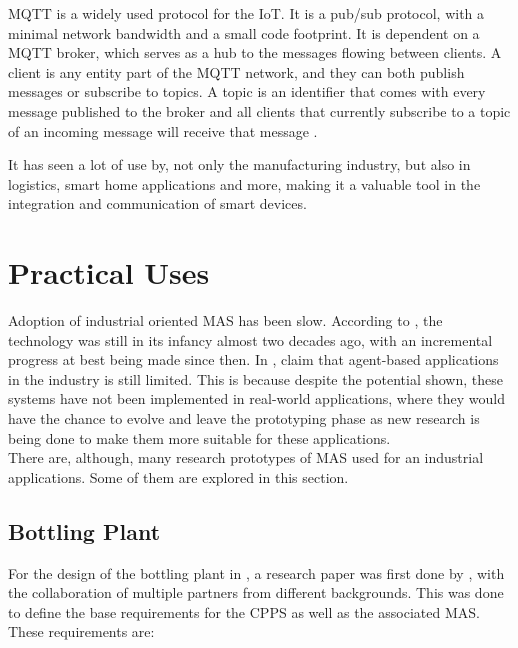 \acrshort{MQTT} is a widely used protocol for the \acrfull{IoT}. It is a pub/sub protocol, with a minimal network bandwidth and a small code footprint. It is dependent on a \acrshort{MQTT} broker, which serves as a hub to the messages flowing between clients. A client is any entity part of the \acrshort{MQTT} network, and they can both publish messages or subscribe to topics. A topic is an identifier that comes with every message published to the broker and all clients that currently subscribe to a topic of an incoming message will receive that message \cite{MQTT_website}.

It has seen a lot of use by, not only the manufacturing industry, but also in logistics, smart home applications and more, making it a valuable tool in the integration and communication of smart devices.

\section{Practical Uses}
\label{sec:practical_uses}

Adoption of industrial oriented \acrshort{MAS} has been slow. According to \citeauthor{karnouskos02} \cite{karnouskos02}, the technology was still in its infancy almost two decades ago, with an incremental progress at best being made since then. In \cite{Karnouskos2019}, \citeauthor{Karnouskos2019} claim that agent-based applications in the industry is still limited. This is because despite the potential shown, these systems have not been implemented in real-world applications, where they would have the chance to evolve and leave the prototyping phase as new research is being done to make them more suitable for these applications.\\

There are, although, many research prototypes of \acrshort{MAS} used for an industrial applications. Some of them are explored in this section.

\subsection{Bottling Plant}
\label{subsec:bottling_plant}

For the design of the bottling plant in \cite{bottling_plant_part2}, a research paper \cite{bottling_plant_part1} was first done by \citeauthor{bottling_plant_part1}, with the collaboration of multiple partners from different backgrounds. This was done to define the base requirements for the \acrshort{CPPS} as well as the associated \acrshort{MAS}. These requirements are:

